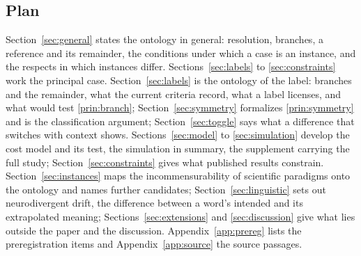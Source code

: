 \subsection{Plan}

Section~\ref{sec:general} states the ontology in general: resolution, branches, a reference and its remainder, the conditions under which a case is an instance, and the respects in which instances differ. Sections~\ref{sec:labels} to \ref{sec:constraints} work the principal case. Section~\ref{sec:labels} is the ontology of the label: branches and the remainder, what the current criteria record, what a label licenses, and what would test \autoref{prin:branch}; Section~\ref{sec:symmetry} formalizes \autoref{prin:symmetry} and is the classification argument; Section~\ref{sec:toggle} says what a difference that switches with context shows. Sections~\ref{sec:model} to \ref{sec:simulation} develop the cost model and its test, the simulation in summary, the supplement carrying the full study; Section~\ref{sec:constraints} gives what published results constrain. Section~\ref{sec:instances} maps the incommensurability of scientific paradigms onto the ontology and names further candidates; Section~\ref{sec:linguistic} sets out neurodivergent drift, the difference between a word's intended and its extrapolated meaning; Sections~\ref{sec:extensions} and \ref{sec:discussion} give what lies outside the paper and the discussion. Appendix~\ref{app:prereg} lists the preregistration items and Appendix~\ref{app:source} the source passages.
